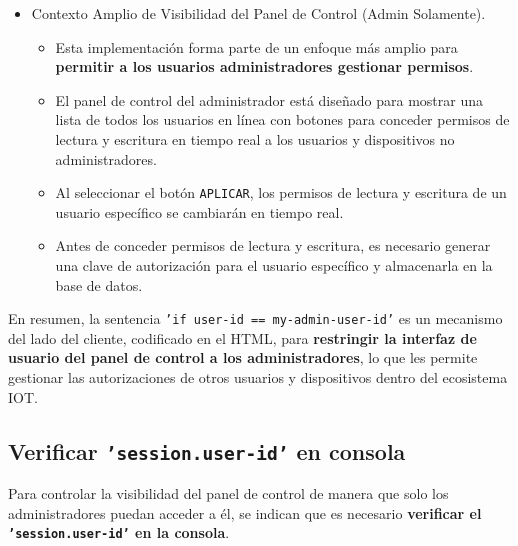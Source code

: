\documentclass{report}
\begin{document}
\begin{itemize}
    \item Contexto Amplio de Visibilidad del Panel de Control (Admin Solamente).
    \begin{itemize}
        \item Esta implementación forma parte de un enfoque más amplio para \textbf{permitir a los usuarios administradores gestionar permisos}.
        \item El panel de control del administrador está diseñado para mostrar una lista de todos los usuarios en línea con botones para conceder permisos 
              de lectura y escritura en tiempo real a los usuarios y dispositivos no administradores.
        \item Al seleccionar el botón \texttt{APLICAR}, los permisos de lectura y escritura de un usuario específico se cambiarán en tiempo real.
        \item Antes de conceder permisos de lectura y escritura, es necesario generar una clave de autorización para el usuario específico y 
              almacenarla en la base de datos.
    \end{itemize}
\end{itemize}

En resumen, la sentencia \texttt{'if user-id == my-admin-user-id'} es un mecanismo del lado del cliente, codificado en el HTML, para 
\textbf{restringir la interfaz de usuario del panel de control a los administradores}, lo que les permite gestionar las autorizaciones de otros usuarios 
y dispositivos dentro del ecosistema IOT.

\subsection{Verificar \texttt{'session.user-id'} en consola}
Para controlar la visibilidad del panel de control de manera que solo los administradores puedan acceder a él, se  indican que es necesario
\textbf{verificar el \texttt{'session.user-id'} en la consola}.
\end{document}
